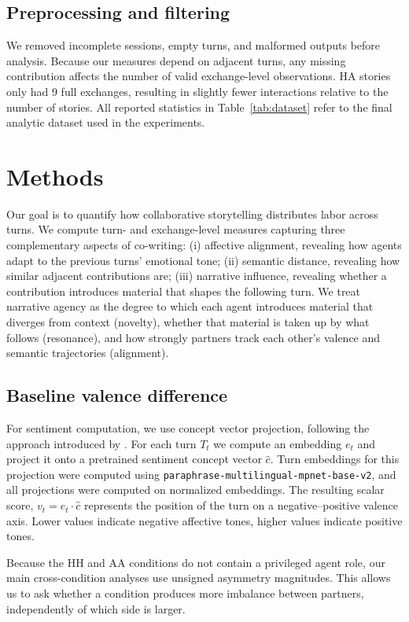 \documentclass[11pt]{article}
\begin{document}
\subsection{Preprocessing and filtering}
We removed incomplete sessions, empty turns, and malformed outputs before analysis. Because our measures depend on adjacent turns, any missing contribution affects the number of valid exchange-level observations. HA stories only had 9 full exchanges, resulting in slightly fewer interactions relative to the number of stories. All reported statistics in Table~\ref{tab:dataset} refer to the final analytic dataset used in the experiments. 

\section{Methods}
Our goal is to quantify how collaborative storytelling distributes labor across turns. We compute turn- and exchange-level measures capturing three complementary aspects of co-writing: (i) affective alignment, revealing how agents adapt to the previous turns' emotional tone; (ii) semantic distance, revealing how similar adjacent contributions are; (iii) narrative influence, revealing whether a contribution introduces material that shapes the following turn. We treat narrative agency as the degree to which each agent introduces material that diverges from context (novelty), whether that material is taken up by what follows (resonance), and how strongly partners track each other's valence and semantic trajectories (alignment). 

\subsection{Baseline valence difference}
For sentiment computation, we use concept vector projection, following the approach introduced by \cite{Lyngbaek_2026}. For each turn $T_t$ we compute an embedding $e_t$ and project it onto a pretrained sentiment concept vector $\hat{c}$. Turn embeddings for this projection were computed using \texttt{paraphrase-multilingual-mpnet-base-v2}, and all projections were computed on normalized embeddings. The resulting scalar score, $v_t = e_t \cdot \hat{c}$  represents the position of the turn on a negative--positive valence axis. Lower values indicate negative affective tones, higher values indicate positive tones. 

Because the HH and AA conditions do not contain a privileged agent role, our main cross-condition analyses use unsigned asymmetry magnitudes. This allows us to ask whether a condition produces more imbalance between partners, independently of which side is larger. 
\end{document}
